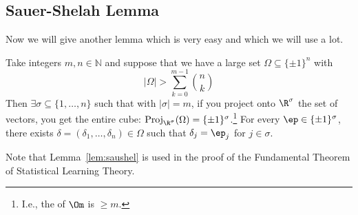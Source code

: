 \subsection{Sauer-Shelah Lemma}

Now we will give another lemma which is very easy and which we will use a lot. 
\begin{lem}  
Take integers $m, n \in \mathbb{N}$ and suppose that we have a large set $\Omega \subseteq \{\pm 1\}^n$ with 
\[
|\Omega| > \sum_{k = 0}^{m - 1} {n \choose k}
\]
Then $\exists \sigma \subseteq \{1, \ldots, n\}$ such that with $|\sigma| = m$, if you project onto $\R^{\sigma}$ the set of vectors, you get the entire cube: $\text{Proj}_{\R^{\sigma}}(\Omega) = \{\pm 1\}^{\sigma}$.\footnote{I.e., the  of $\Om$ is $\ge m$.} For every $\ep \in \{\pm 1\}^{\sigma}$, there exists $\delta = (\delta_1, \ldots, \delta_n) \in \Omega$ such that $\delta_j = \ep_j$ for $j \in \sigma$.
\end{lem}

Note that Lemma~\ref{lem:saushel} is used in the proof of the Fundamental Theorem of Statistical Learning Theory. 

